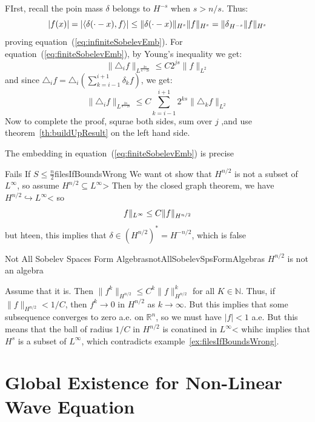\documentclass{book}
\newenvironment{Proof}[1][]
  {\begin{ProofTcb}[#1]}
  {\end{ProofTcb}}
\newcommand{\N}{{\mathbb{N}}}
\newcommand{\R}{{\mathbb{R}}}
\newcommand{\sse}{\subseteq}
\newcommand{\rw}{\rightarrow}
\begin{document}
\begin{Proof}
	FIrst, recall the poin mass $\delta$ belongs to $H^{-s}$ when $s > n/s$. Thus:
	\[
		|f(x)| = |\langle \delta(\cdot - x), f\rangle| \le \|\delta(\cdot -x)\|_{H^s}\|f\|_{H^s}
		= \|\delta\\_{H^{-s}}\|f\|_{H^s}
	\]
	proving equation~(\ref{eq:infiniteSobelevEmb}). For equation~(\ref{eq:finiteSobelevEmb}), by Young's
	inequality we get:
	\[
		\|\triangle_i f\|_{L^{\frac{2n}{n-2s}}} \le C2^{js}\|f\|_{L^2}
	\]
	and since $\triangle_i f = \triangle_i \left( \sum_{k = i-1}^{i+1} \delta_k f\right)$, we get:
	\[
		\| \triangle_i f\|_{L^{\frac{2n}{n-2s}}} \le C \sum_{k = i-1}^{i+1} 2^{ks}\|\triangle_k f\|_{L^2}
	\]
	Now to complete the proof, squrae both sides, sum over $j$ ,and use theorem~\ref{th:buildUpResult} on the
	left hand side.
\end{Proof}

The embedding in equation~(\ref{eq:finiteSobelevEmb}) is precise

\begin{example}{Fails If $S \le \frac{n}{2}$}{filesIfBoundsWrong}
	We want ot show that $H^{n/2}$ is not a subset of $L^\infty$, so assume $H^{n/2} \sse L^\infty$> Then by the
	closed graph theorem, we have $H^{n/2} \hookrightarrow L^\infty$< so
	\[
		\\f\|_{L^\infty} \le C\|f\|_{H^{n/2}}
	\]
	but hteen, this implies that $\delta \in (H^{n/2})^* = H^{-n/2}$, which is false
\end{example}

\begin{cor}{Not All Sobelev Spaces Form Algebras}{notAllSobelevSpsFormAlgebras}
	$H^{n/2}$ is not an algebra
\end{cor}

\begin{Proof}
	Assume that it is. Then $\|f^k\|_{H^{n/2}} \le C^k\|f\|_{H^{n/2}}^k$ for all $K \in \N$. Thus, if $\|f\|_{H^{n/2}}
	< 1/C$, then $f^k \rw 0$ in $H^{n/2}$ as $k \rw \infty$. But this implies that some subsequence converges to
	zero a.e. on $\R^n$, so we must have $|f| < 1$ a.e. But this means that the ball of radius $1/C$ in $H^{n/2}$
	is conatined in $L^\infty$< whihc implies that $H^s$ is a subset of $L^\infty$, which contradicts
	example~\ref{ex:filesIfBoundsWrong}.
\end{Proof}


\chapter{Global Existence for Non-Linear Wave Equation}\label{cha:globalSolWaveEq}
\end{document}
